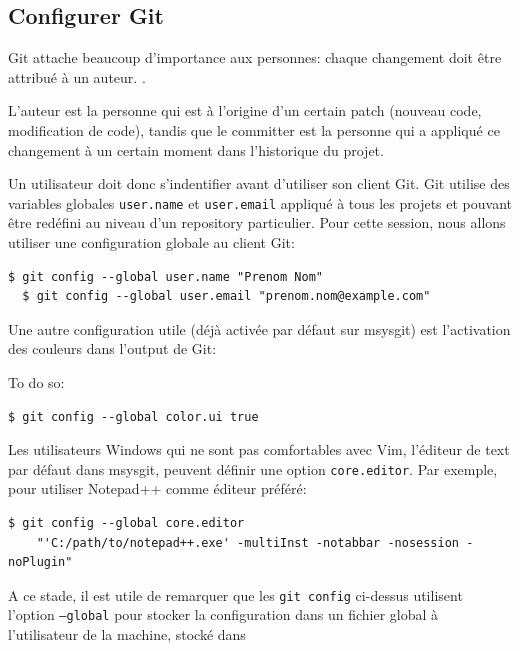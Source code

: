 \documentclass{../../common/tufte-latex/tufte-handout}
\begin{document}
\subsection{Configurer Git}

Git attache beaucoup d'importance aux personnes: chaque changement doit être attribué à un auteur. 
.

L'auteur est la personne qui est à l'origine d'un certain patch (nouveau code, modification de code), tandis que le committer est la personne qui a appliqué ce changement à un certain moment dans l'historique du projet.

Un utilisateur doit donc s'indentifier avant d'utiliser son client Git.
Git utilise des variables globales \texttt{user.name} et \texttt{user.email} appliqué à tous les projets et pouvant être redéfini au niveau d'un repository particulier.
Pour cette session, nous allons utiliser une configuration globale au client Git:

\begin{lstlisting}[style=BashInputStyle]
  $ git config --global user.name "Prenom Nom"
  $ git config --global user.email "prenom.nom@example.com"
\end{lstlisting}

Une autre configuration utile (déjà activée par défaut sur msysgit) est l'activation des couleurs dans l'output de Git:

\noindent To do so:

\begin{lstlisting}[style=BashInputStyle]
  $ git config --global color.ui true
\end{lstlisting}

Les utilisateurs Windows qui ne sont pas comfortables avec Vim, l'éditeur de text par défaut dans msysgit, peuvent définir une option \texttt{core.editor}.
Par exemple, pour utiliser Notepad++ comme éditeur préféré:

\begin{lstlisting}[style=BashInputStyle]
  $ git config --global core.editor
    "'C:/path/to/notepad++.exe' -multiInst -notabbar -nosession -noPlugin"
\end{lstlisting}

A ce stade, il est utile de remarquer que les \texttt{git config} ci-dessus utilisent l'option \texttt{--global}  pour stocker la configuration dans un fichier global à l'utilisateur de la machine, stocké dans 
\end{document}
